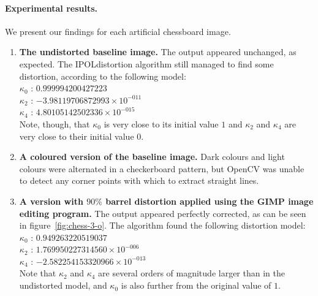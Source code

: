 \paragraph{Experimental results.}
We present our findings for each artificial chessboard image.
\begin{enumerate}
  \item \textbf{The undistorted baseline image.} The output appeared unchanged, as expected. The IPOLdistortion algorithm still managed to find some distortion, according to the following model:\\
   $ \kappa_{0}$ : $0.999994200427223$\\
   $ \kappa_{2}$ : $-3.98119706872993 \times 10^{-011}$\\
   $ \kappa_{4}$ : $4.80105142502336 \times 10^{-015}$\\
   Note, though, that $\kappa_{0}$ is very close to its initial value $1$ and $\kappa_{2}$ and $\kappa_{4}$ are very close to their initial value $0$.
  \item \textbf{A coloured version of the baseline image.} Dark colours and light colours were alternated in a checkerboard pattern, but OpenCV was unable to detect any corner points with which to extract straight lines.
  \item \textbf{A version with $90\%$ barrel distortion applied using the GIMP image editing program.} The output appeared perfectly corrected, as can be seen in figure~\ref{fig:chess-3-o}. The algorithm found the following distortion model:\\
   $ \kappa_{0}$ : $0.949263220519037$\\
   $ \kappa_{2}$ : $1.769950227314560 \times 10^{-006}$\\
   $ \kappa_{4}$ : $-2.582254153320966 \times 10^{-013}$\\
   Note that $\kappa_{2}$ and $\kappa_{4}$ are several orders of magnitude larger than in the undistorted model, and $\kappa_{0}$ is also further from the original value of $1$.
\begin{figure}[H]
  \centering

\end{figure}
\end{enumerate}
